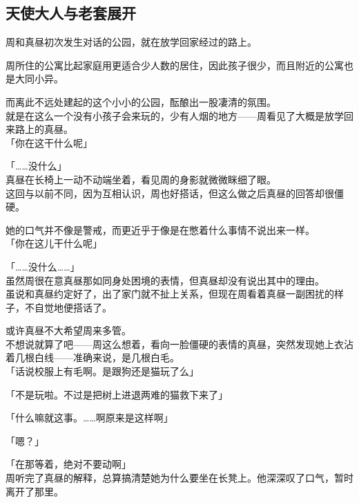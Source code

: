 \subsection{天使大人与老套展开}

周和真昼初次发生对话的公园，就在放学回家经过的路上。

周所住的公寓比起家庭用更适合少人数的居住，因此孩子很少，而且附近的公寓也是大同小异。

而离此不远处建起的这个小小的公园，酝酿出一股凄清的氛围。\\

就是在这么一个没有小孩子会来玩的，少有人烟的地方——周看见了大概是放学回来路上的真昼。\\

「你在这干什么呢」

「……没什么」\\

真昼在长椅上一动不动端坐着，看见周的身影就微微眯细了眼。\\

这回与以前不同，因为互相认识，周也好搭话，但这么做之后真昼的回答却很僵硬。

她的口气并不像是警戒，而更近乎于像是在憋着什么事情不说出来一样。\\

「你在这儿干什么呢」

「……没什么……」\\

虽然周很在意真昼那如同身处困境的表情，但真昼却没有说出其中的理由。\\

虽说和真昼约定好了，出了家门就不扯上关系，但现在周看着真昼一副困扰的样子，不自觉地便搭话了。

或许真昼不大希望周来多管。\\

不想说就算了吧——周这么想着，看向一脸僵硬的表情的真昼，突然发现她上衣沾着几根白线——准确来说，是几根白毛。\\

「话说校服上有毛啊。是跟狗还是猫玩了么」

「不是玩啦。不过是把树上进退两难的猫救下来了」

「什么嘛就这事。……啊原来是这样啊」

「嗯？」

「在那等着，绝对不要动啊」\\

周听完了真昼的解释，总算搞清楚她为什么要坐在长凳上。他深深叹了口气，暂时离开了那里。\\

